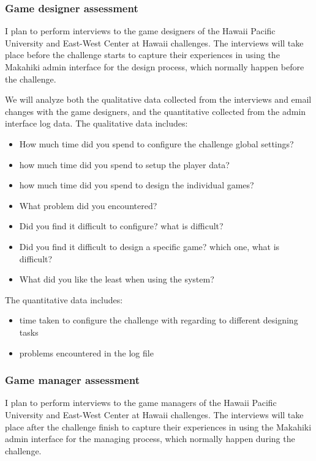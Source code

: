 \subsubsection{Game designer assessment}
I plan to perform interviews to the game designers of the Hawaii Pacific University and East-West Center at Hawaii challenges. The interviews will take place before the challenge starts to capture their experiences in using the Makahiki admin interface for the design process, which normally happen before the challenge.

We will analyze both the qualitative data collected from the interviews and email changes with the game designers, and the quantitative collected from the admin interface log data. The qualitative data includes:
\begin{itemize}
    \item How much time did you spend to configure the challenge global settings?
    \item how much time did you spend to setup the player data?
    \item how much time did you spend to design the individual games?
    \item What problem did you encountered?
    \item Did you find it difficult to configure? what is difficult?
    \item Did you find it difficult to design a specific game? which one, what is difficult?
    \item What did you like the least when using the system?
\end{itemize}

The quantitative data includes:
\begin{itemize}
 \item time taken to configure the challenge with regarding to different designing tasks
 \item problems encountered in the log file
\end{itemize}

\subsubsection{Game manager assessment}
I plan to perform interviews to the game managers of the Hawaii Pacific University and East-West Center at Hawaii challenges. The interviews will take place after the challenge finish to capture their experiences in using the Makahiki admin interface for the managing process, which normally happen during the challenge.

